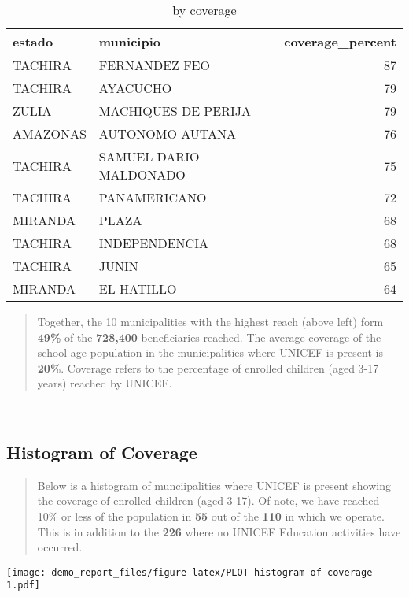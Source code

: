 \documentclass[
]{article}
\begin{document}
\begin{table}

\caption{\label{tab:municipalities top TABLE}by coverage}
\begin{tabular}[t]{l|l|r}
\hline
estado & municipio & coverage\_percent\\
\hline
TACHIRA & FERNANDEZ FEO & 87\\
\hline
TACHIRA & AYACUCHO & 79\\
\hline
ZULIA & MACHIQUES DE PERIJA & 79\\
\hline
AMAZONAS & AUTONOMO AUTANA & 76\\
\hline
TACHIRA & SAMUEL DARIO MALDONADO & 75\\
\hline
TACHIRA & PANAMERICANO & 72\\
\hline
MIRANDA & PLAZA & 68\\
\hline
TACHIRA & INDEPENDENCIA & 68\\
\hline
TACHIRA & JUNIN & 65\\
\hline
MIRANDA & EL HATILLO & 64\\
\hline
\end{tabular}
\end{table}

\begin{quote}
Together, the 10 municipalities with the highest reach (above left) form
\textbf{49\%} of the \textbf{728,400} beneficiaries reached. The average
coverage of the school-age population in the municipalities where UNICEF
is present is \textbf{20\%}. Coverage refers to the percentage of
enrolled children (aged 3-17 years) reached by UNICEF.
\end{quote}

~

\hypertarget{histogram-of-coverage}{%
\subsection{Histogram of Coverage}\label{histogram-of-coverage}}

\begin{quote}
Below is a histogram of munciipalities where UNICEF is present showing
the coverage of enrolled children (aged 3-17). Of note, we have reached
10\% or less of the population in \textbf{55} out of the \textbf{110} in
which we operate. This is in addition to the \textbf{226} where no
UNICEF Education activities have occurred.
\end{quote}

\texttt{[image: demo\_report\_files/figure-latex/PLOT histogram of coverage-1.pdf]}
\end{document}
